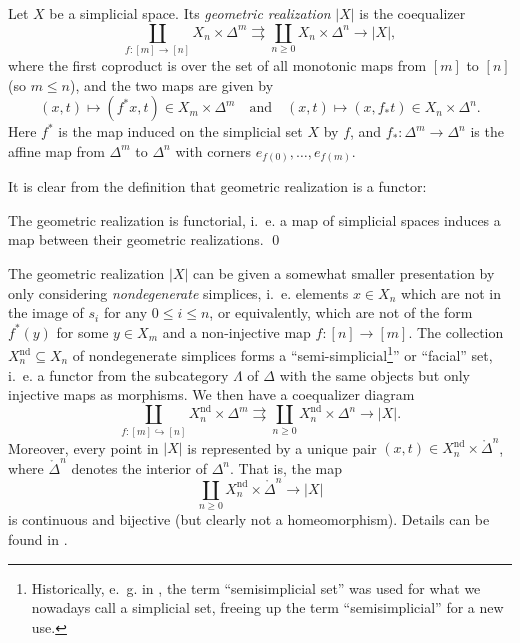\documentclass[a4paper,openany]{scrbook}
\begin{document}
\begin{defn}
Let $X$ be a simplicial space. Its \emph{geometric realization} $|X|$ is the coequalizer
\[
\coprod_{f\colon [m] \to [n]} X_n \times \Delta^m \rightrightarrows \coprod_{n \geq 0} X_n \times \Delta^n \to |X|,
\]
where the first coproduct is over the set of all monotonic maps from $[m]$ to $[n]$ (so $m \leq n$), and the two maps are given by
\[
(x,t) \mapsto (f^*x,t) \in X_m \times \Delta^m \quad \text{and} \quad (x,t) \mapsto (x,f_*t) \in X_n \times \Delta^n.
\]
Here $f^*$ is the map induced on the simplicial set $X$ by $f$, and $f_*\colon \Delta^m \to \Delta^n$ is the affine map from $\Delta^m$ to $\Delta^n$ with corners $e_{f(0)},\dots,e_{f(m)}$.
\end{defn}

It is clear from the definition that geometric realization is a functor:

\begin{lemma}
The geometric realization is functorial, i.~e. a map of simplicial spaces induces a map between their geometric realizations. \qed
\end{lemma}

The geometric realization $|X|$ can be given a somewhat smaller presentation by only considering \emph{nondegenerate} simplices, i.~e. elements $x \in X_n$ which are not in the image of $s_i$ for any $0 \leq i \leq n$, or equivalently, which are not of the form $f^*(y)$ for some $y \in X_m$ and a non-injective map $f\colon [n] \to [m]$. The collection $X^{\operatorname{nd}}_n \subseteq X_n$ of nondegenerate simplices forms a ``semi-simplicial\footnote{Historically, e.~g. in \cite{milnor:57}, the term ``semisimplicial set'' was used for what we nowadays call a simplicial set, freeing up the term ``semisimplicial'' for a new use.}'' or ``facial'' set, i.~e. a functor from the subcategory $\Lambda$ of $\Delta$ with the same objects but only injective maps as morphisms. We then have a coequalizer diagram
\begin{equation}\label{eq:realizationwithnondegenerates}
\coprod_{f\colon [m] \hookrightarrow [n]} X^{\operatorname{nd}}_n \times \Delta^m \rightrightarrows \coprod_{n \geq 0} X^{\operatorname{nd}}_n \times \Delta^n \to |X|.
\end{equation}
Moreover, every point in $|X|$ is represented by a unique pair $(x,t) \in X^{\operatorname{nd}}_n \times \mathring\Delta^n$, where $\mathring\Delta^n$ denotes the interior of $\Delta^n$. That is, the map
\[
\coprod_{n \geq 0} X^{\operatorname{nd}}_n \times \mathring \Delta^n \to |X|
\]
is continuous and bijective (but clearly not a homeomorphism). Details can be found in \cite{milnor:57}.
\end{document}
